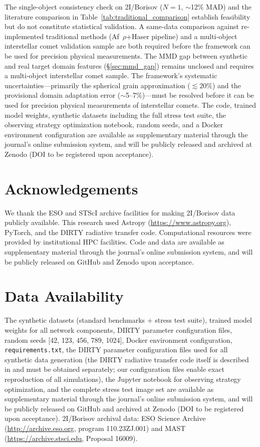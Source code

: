 \documentclass[usenatbib]{mnras}
\begin{document}
The single-object consistency check on 2I/Borisov ($N=1$, $\sim$12\% MAD) and the literature comparison in Table~\ref{tab:traditional_comparison} establish feasibility but do not constitute statistical validation. A same-data comparison against re-implemented traditional methods (Af~$\rho$+Haser pipeline) and a multi-object interstellar comet validation sample are both required before the framework can be used for precision physical measurements. The MMD gap between synthetic and real target domain features (\S\ref{sec:mmd_gap}) remains unclosed and requires a multi-object interstellar comet sample. The framework's systematic uncertainties---primarily the spherical grain approximation ($\lesssim 20\%$) and the provisional domain adaptation error ($\sim$5--7\%)---must be resolved before it can be used for precision physical measurements of interstellar comets. The code, trained model weights, synthetic datasets including the full stress test suite, the observing strategy optimization notebook, random seeds, and a Docker environment configuration are available as supplementary material through the journal's online submission system, and will be publicly released and archived at Zenodo (DOI to be registered upon acceptance).

\section*{Acknowledgements}
We thank the ESO and STScI archive facilities for making 2I/Borisov data publicly available. This research used Astropy (\url{https://www.astropy.org}), PyTorch, and the DIRTY radiative transfer code. Computational resources were provided by institutional HPC facilities. Code and data are available as supplementary material through the journal's online submission system, and will be publicly released on GitHub and Zenodo upon acceptance.

\section*{Data Availability}
The synthetic datasets (standard benchmarks + stress test suite), trained model weights for all network components, DIRTY parameter configuration files, random seeds [42, 123, 456, 789, 1024], Docker environment configuration, \texttt{requirements.txt}, the DIRTY parameter configuration files used for all synthetic data generation (the DIRTY radiative transfer code itself is described in \citet{gordon01} and must be obtained separately; our configuration files enable exact reproduction of all simulations), the Jupyter notebook for observing strategy optimization, and the complete stress test image set are available as supplementary material through the journal's online submission system, and will be publicly released on GitHub and archived at Zenodo (DOI to be registered upon acceptance). 2I/Borisov archival data: ESO Science Archive (\url{http://archive.eso.org}, program 110.23ZJ.001) and MAST (\url{https://archive.stsci.edu}, Proposal 16009).



\end{document}
